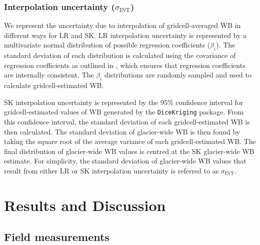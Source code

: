 \documentclass[review,oneside, letterpaper]{igs}
\begin{document}
	\subsubsection{Interpolation uncertainty ($\sigma_{\mathrm{INT}}$)}
We represent the uncertainty due to interpolation of gridcell-averaged WB in different ways for LR and SK. LR interpolation uncertainty is represented by a multivariate normal distribution of possible regression coefficients ($\beta_i$). The standard deviation of each distribution is calculated using the covariance of regression coefficients as outlined in \cite{Bagos2015}, which ensures that regression coefficients are internally consistent. The $\beta_i$ distributions are randomly sampled and used to calculate gridcell-estimated WB.

SK interpolation uncertainty is represented by the 95\% confidence interval for gridcell-estimated values of WB generated by the \texttt{DiceKriging} package. From this confidence interval, the standard deviation of each gridcell-estimated WB is then calculated. The standard deviation of glacier-wide WB is then found by taking the square root of the average variance of each gridcell-estimated WB. The final distribution of glacier-wide WB values is centred at the SK glacier-wide WB estimate. For simplicity, the standard deviation of glacier-wide WB values that result from either LR or SK interpolation uncertainty is referred to as $\sigma_{\mathrm{INT}}$.



\section{Results and Discussion}

\subsection{Field measurements}
\end{document}

